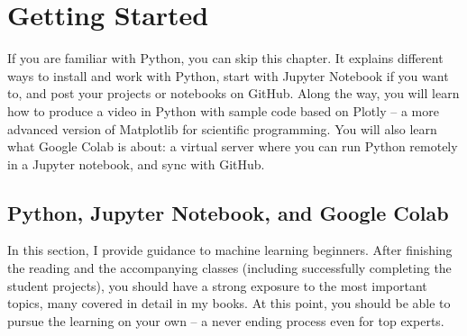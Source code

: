 \documentclass[oneside,10pt]{book}
\begin{document}


\hypersetup{linkcolor=red}
\renewcommand{\baselinestretch}{0.97}\normalsize
\tableofcontents 
\renewcommand{\baselinestretch}{1.00}\normalsize



\chapter{Getting Started} %

If you are familiar with Python, you can skip this chapter. It explains different ways to install and work with Python, start with
 Jupyter Notebook if you want to, and post your projects or notebooks on GitHub. Along the way, you will learn how to produce a video in Python with sample code based on  Plotly -- a more advanced version of Matplotlib for scientific programming. You will also learn what Google Colab is about: a virtual server where you can run Python remotely in a Jupyter notebook, and sync with GitHub.


\section{Python, Jupyter Notebook, and Google Colab}

In this section, I provide guidance to machine learning beginners. After finishing the reading and the accompanying classes (including successfully completing the student projects), you should have a strong exposure to the most important topics, many covered in detail in my books. At this point, you should be able to pursue the learning on your own -- a never ending process even for top experts.

\end{document}
